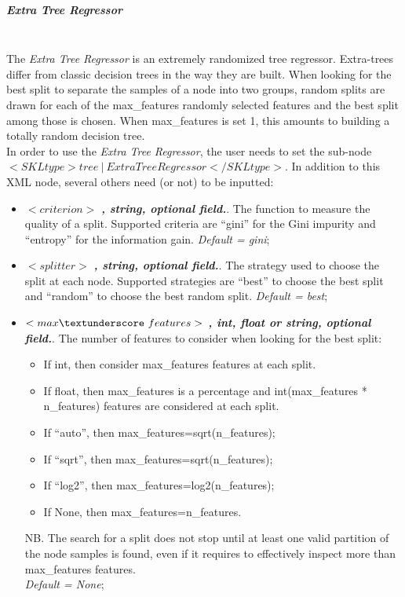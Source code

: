 \subparagraph{Extra Tree Regressor}
\mbox{}
\\The \textit{Extra Tree Regressor} is an extremely randomized tree regressor.
Extra-trees differ from classic decision trees in the way they are built. When looking for the best split to separate the samples of a node into two groups, random splits are drawn for each of the max\_features randomly selected features and the best split among those is chosen. When max\_features is set 1, this amounts to building a totally random decision tree.
\\In order to use the \textit{Extra Tree Regressor}, the user needs to set the sub-node $<SKLtype>tree~\vert~ExtraTreeRegressor</SKLtype>$. In addition to this XML node, several others need (or not) to be inputted:
\begin{itemize}
\item $<criterion>$ \textbf{\textit{, string, optional field.}}.  The function to measure the quality of a split. Supported criteria are ``gini'' for the Gini impurity and ``entropy'' for the information gain. \textit{Default = gini};
\item $<splitter>$ \textbf{\textit{, string, optional field.}}. The strategy used to choose the split at each node. Supported strategies are ``best'' to choose the best split and ``random'' to choose the best random split. \textit{Default = best};
\item $<max\textunderscore~features>$ \textbf{\textit{, int, float or string, optional field.}}. The number of features to consider when looking for the best split:
\begin{itemize}
\item If int, then consider max\_features features at each split.
\item If float, then max\_features  is a percentage and int(max\_features * n\_features) features are considered at each split.
\item If “auto”, then max\_features=sqrt(n\_features);
\item If “sqrt”, then max\_features=sqrt(n\_features);
\item If “log2”, then max\_features=log2(n\_features);
\item If None, then max\_features=n\_features.
\end{itemize}
NB. The search for a split does not stop until at least one valid partition of the node samples is found, even if it requires to effectively inspect more than max\_features features. 
\\\textit{Default = None};

\end{itemize}
